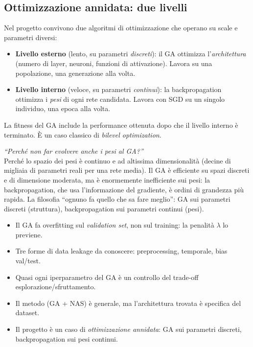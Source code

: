 \documentclass[11pt,a4paper]{article}
\begin{document}
\subsection{Ottimizzazione annidata: due livelli}

\begin{concetto}[GA + backpropagation = due ottimizzatori in cascata]
Nel progetto convivono due algoritmi di ottimizzazione che operano su
scale e parametri diversi:
\begin{itemize}
    \item \textbf{Livello esterno} (lento, su parametri \emph{discreti}):
          il GA ottimizza l'\emph{architettura} (numero di layer, neuroni,
          funzioni di attivazione). Lavora su una popolazione, una
          generazione alla volta.
    \item \textbf{Livello interno} (veloce, su parametri \emph{continui}):
          la backpropagation ottimizza i \emph{pesi} di ogni rete candidata.
          Lavora con SGD su un singolo individuo, una epoca alla volta.
\end{itemize}
La fitness del GA include la performance ottenuta dopo che il livello
interno è terminato. È un caso classico di \emph{bilevel optimization}.
\end{concetto}

\begin{domanda}
\textit{``Perché non far evolvere anche i pesi al GA?''}\\
Perché lo spazio dei pesi è continuo e ad altissima dimensionalità (decine
di migliaia di parametri reali per una rete media). Il GA è efficiente su
spazi discreti e di dimensione moderata, ma è enormemente inefficiente
sui pesi: la backpropagation, che usa l'informazione del gradiente, è
ordini di grandezza più rapida. La filosofia ``ognuno fa quello che sa
fare meglio'': GA sui parametri discreti (struttura), backpropagation sui
parametri continui (pesi).
\end{domanda}

\begin{riassunto}
\begin{itemize}
    \item Il GA fa overfitting sul \emph{validation set}, non sul training: la penalità $\lambda$ lo previene.
    \item Tre forme di data leakage da conoscere: preprocessing, temporale, bias val/test.
    \item Quasi ogni iperparametro del GA è un controllo del trade-off esplorazione/sfruttamento.
    \item Il metodo (GA + NAS) è generale, ma l'architettura trovata è specifica del dataset.
    \item Il progetto è un caso di \emph{ottimizzazione annidata}: GA sui parametri discreti, backpropagation sui pesi continui.
\end{itemize}
\end{riassunto}
\end{document}
